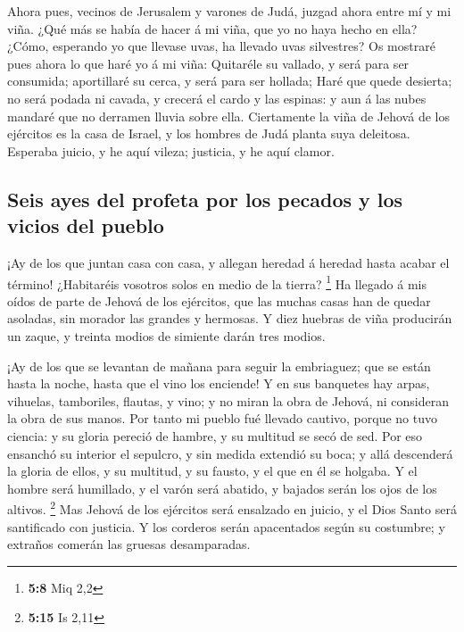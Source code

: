  Ahora pues, vecinos de Jerusalem y varones de Judá,
juzgad ahora entre mí y mi viña.  ¿Qué más se había de
hacer á mi viña, que yo no haya hecho en ella? ¿Cómo, esperando yo que
llevase uvas, ha llevado uvas silvestres?  Os mostraré
pues ahora lo que haré yo á mi viña: Quitaréle su vallado, y será para
ser consumida; aportillaré su cerca, y será para ser hollada;
 Haré que quede desierta; no será podada ni cavada, y
crecerá el cardo y las espinas: y aun á las nubes mandaré que no
derramen lluvia sobre ella.  Ciertamente la viña de Jehová
de los ejércitos es la casa de Israel, y los hombres de Judá planta suya
deleitosa. Esperaba juicio, y he aquí vileza; justicia, y he aquí
clamor.

\hypertarget{seis-ayes-del-profeta-por-los-pecados-y-los-vicios-del-pueblo}{%
\subsection{Seis ayes del profeta por los pecados y los vicios del
pueblo}\label{seis-ayes-del-profeta-por-los-pecados-y-los-vicios-del-pueblo}}

 ¡Ay de los que juntan casa con casa, y allegan heredad á
heredad hasta acabar el término! ¿Habitaréis vosotros solos en medio de
la tierra? \footnote{\textbf{5:8} Miq 2,2}  Ha llegado á
mis oídos de parte de Jehová de los ejércitos, que las muchas casas han
de quedar asoladas, sin morador las grandes y hermosas. 
Y diez huebras de viña producirán un zaque, y treinta modios de simiente
darán tres modios.

 ¡Ay de los que se levantan de mañana para seguir la
embriaguez; que se están hasta la noche, hasta que el vino los enciende!
 Y en sus banquetes hay arpas, vihuelas, tamboriles,
flautas, y vino; y no miran la obra de Jehová, ni consideran la obra de
sus manos.  Por tanto mi pueblo fué llevado cautivo,
porque no tuvo ciencia: y su gloria pereció de hambre, y su multitud se
secó de sed.  Por eso ensanchó su interior el sepulcro, y
sin medida extendió su boca; y allá descenderá la gloria de ellos, y su
multitud, y su fausto, y el que en él se holgaba.  Y el
hombre será humillado, y el varón será abatido, y bajados serán los ojos
de los altivos. \footnote{\textbf{5:15} Is 2,11}  Mas
Jehová de los ejércitos será ensalzado en juicio, y el Dios Santo será
santificado con justicia.  Y los corderos serán
apacentados según su costumbre; y extraños comerán las gruesas
desamparadas.

